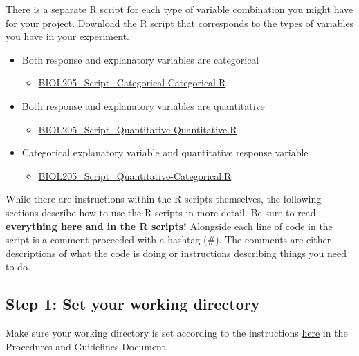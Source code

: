 \documentclass[
]{book}
\providecommand{\tightlist}{%
  \setlength{\itemsep}{0pt}\setlength{\parskip}{0pt}}
\begin{document}
There is a separate R script for each type of variable combination you might have for your project. Download the R script that corresponds to the types of variables you have in your experiment.

\begin{itemize}
\tightlist
\item
  Both response and explanatory variables are categorical

  \begin{itemize}
  \tightlist
  \item
    \href{https://osf.io/download/sg7y6}{BIOL205\_Script\_Categorical-Categorical.R}
  \end{itemize}
\item
  Both response and explanatory variables are quantitative

  \begin{itemize}
  \tightlist
  \item
    \href{https://osf.io/download/adwg4}{BIOL205\_Script\_Quantitative-Quantitative.R}
  \end{itemize}
\item
  Categorical explanatory variable and quantitative response variable

  \begin{itemize}
  \tightlist
  \item
    \href{https://osf.io/download/46mpk}{BIOL205\_Script\_Quantitative-Categorical.R}
  \end{itemize}
\end{itemize}

While there are instructions within the R scripts themselves, the following sections describe how to use the R scripts in more detail. Be sure to read \textbf{everything here and in the R scripts!} Alongside each line of code in the script is a comment proceeded with a hashtag (\#). The comments are either descriptions of what the code is doing or instructions describing things you need to do.

\hypertarget{step-1-set-your-working-directory}{%
\subsection*{Step 1: Set your working directory}\label{step-1-set-your-working-directory}}

Make sure your working directory is set according to the instructions \href{https://ubco-biology.github.io/Procedures-and-Guidelines/set-a-working-directory-in-rstudio.html}{here} in the Procedures and Guidelines Document.
\end{document}
